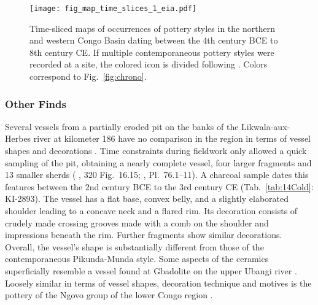 \documentclass[smallextended,natbib]{svjour3}       %
\begin{document}
\begin{figure}[!tbp]
	\centering
	\texttt{[image: fig\_map\_time\_slices\_1\_eia.pdf]}
	\caption{Time-sliced maps of occurrences of pottery styles in the northern and western Congo Basin dating between the 4th century BCE to 8th century CE. If multiple contemporaneous pottery styles were recorded at a site, the colored icon is divided following \citet[218--244 Fig.~100--107]{Seidensticker.2021e}. Colors correspond to Fig.~\ref{fig:chrono}.}
	\label{fig:timeslices_1_eia}
\end{figure}

\subsubsection*{Other Finds}

Several vessels from a partially eroded pit on the banks of the Likwala-aux-Herbes river at kilometer 186 have no comparison in the region in terms of vessel shapes and decorations \citep[165--168, 339--340]{Seidensticker.2021e}. Time constraints during fieldwork only allowed a quick sampling of the pit, obtaining a nearly complete vessel, four larger fragments and 13 smaller sherds (\citeauthor{Eggert.1993} \citeyear{Eggert.1993}, 320 Fig.~16.15; \citeauthor{Seidensticker.2021e} \citeyear{Seidensticker.2021e}, Pl.~76.1--11). A charcoal sample dates this features between the 2nd century BCE to the 3rd century CE (Tab.~\ref{tab:14Cold}: KI-2893). The vessel has a flat base, convex belly, and a slightly elaborated shoulder leading to a concave neck and a flared rim. Its decoration consists of crudely made crossing grooves made with a comb on the shoulder and impressions beneath the rim. Further fragments show similar decorations. Overall, the vessel's shape is substantially different from those of the contemporaneous Pikunda-Munda style. Some aspects of the ceramics superficially resemble a vessel found at Gbadolite on the upper Ubangi river \citep[277--278 Fig.~7]{Eggert.1984}. Loosely similar in terms of vessel shapes, decoration technique and motives is the pottery of the Ngovo group of the lower Congo region \citep[167 Fig.~81]{deMaret.1986,Seidensticker.2021e}.
\end{document}
